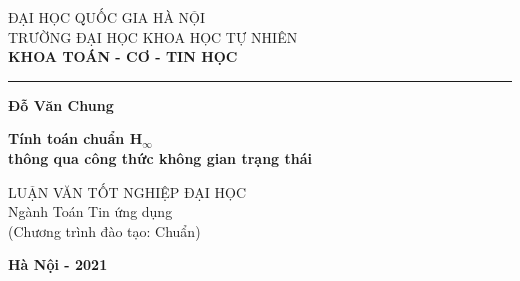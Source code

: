 \documentclass[12pt,a4paper]{article}
\begin{document}
\begin{titlepage}


\begin{center}
	{\fontsize{14pt}{15.6}\selectfont
	ĐẠI HỌC QUỐC GIA HÀ NỘI \\
	TRƯỜNG ĐẠI HỌC KHOA HỌC TỰ NHIÊN\\}
	\medspace
	{\fontsize{13pt}{15.6}\selectfont
	\textbf{KHOA TOÁN - CƠ - TIN HỌC}}
	
	\rule{7.25cm}{1pt}
	
	\vfill
	{\fontsize{14}{15.6}\selectfont \textbf{Đỗ Văn Chung}}
	\vfill
	
	{\fontsize{18}{20}\selectfont \textbf{Tính toán chuẩn H$_\infty$ \\ thông qua công thức không gian trạng thái}}
	\vfill
	
	{\fontsize{14}{15.6}\selectfont 
	LUẬN VĂN TỐT NGHIỆP ĐẠI HỌC\\
	\vspace{1cm}
	Ngành Toán Tin ứng dụng\\
	(Chương trình đào tạo: Chuẩn)
	}

	\vfill
	{\fontsize{14}{15.6}\selectfont \textbf{Hà Nội - 2021}}
\end{center}
\end{titlepage}
\end{document}
